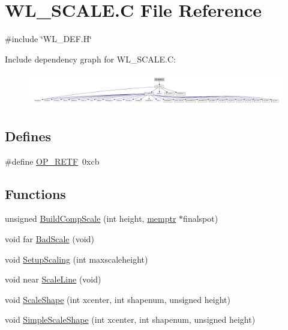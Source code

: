 \hypertarget{WL__SCALE_8C}{
\section{WL\_\-SCALE.C File Reference}
\label{WL__SCALE_8C}
}
{\ttfamily \#include \char`\"{}WL\_\-DEF.H\char`\"{}}\par
Include dependency graph for WL\_\-SCALE.C:
\nopagebreak
\begin{figure}[H]
\begin{center}
\leavevmode
\includegraphics[width=400pt]{WL__SCALE_8C__incl}
\end{center}
\end{figure}
\subsection*{Defines}
\begin{DoxyCompactItemize}
\item 
\#define \hyperlink{WL__SCALE_8C_ac074f674fb85687a1a619fffb702967b}{OP\_\-RETF}~0xcb
\end{DoxyCompactItemize}
\subsection*{Functions}
\begin{DoxyCompactItemize}
\item 
unsigned \hyperlink{WL__SCALE_8C_a3cccf90eaebbbbcd63aeabcbb3e7d8d5}{BuildCompScale} (int height, \hyperlink{ID__MM_8H_a04062decc7eb282b066c65e9137bb9bf}{memptr} $\ast$finalspot)
\item 
void far \hyperlink{WL__SCALE_8C_a1d7dcb4682fb94ac602a78018af0b729}{BadScale} (void)
\item 
void \hyperlink{WL__SCALE_8C_a4604aaa0f82797a8a88e59394a3bef9e}{SetupScaling} (int maxscaleheight)
\item 
void near \hyperlink{WL__SCALE_8C_a9880cdbf8e6e563356f0c5e27b038136}{ScaleLine} (void)
\item 
void \hyperlink{WL__SCALE_8C_ac4e07b4cd66c3fa71e9f675325f5e8ca}{ScaleShape} (int xcenter, int shapenum, unsigned height)
\item 
void \hyperlink{WL__SCALE_8C_a11d04052928f61aec9102f6cce71fadb}{SimpleScaleShape} (int xcenter, int shapenum, unsigned height)
\end{DoxyCompactItemize}
